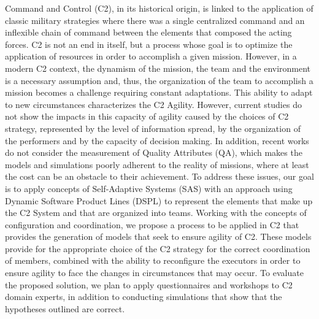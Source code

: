 Command and Control (C2), in its historical origin, is linked to the application of classic military strategies where there was a single centralized command and an inflexible chain of command between the elements that composed the acting forces. C2 is not an end in itself, but a process whose goal is to optimize the application of resources in order to accomplish a given mission. However, in a modern C2 context, the dynamism of the mission, the team and the environment is a necessary assumption and, thus, the organization of the team to accomplish a mission becomes a challenge requiring constant adaptations. This ability to adapt to new circumstances characterizes the C2 Agility. However, current studies do not show the impacts in this capacity of agility caused by the choices of C2 strategy, represented by the level of information spread, by the organization of the performers and by the capacity of decision making. In addition, recent works do not consider the measurement of Quality Attributes (QA), which makes the models and simulations poorly adherent to the reality of missions, where at least the cost can be an obstacle to their achievement. To address these issues, our goal is to apply concepts of Self-Adaptive Systems (SAS) with an approach using Dynamic Software Product Lines (DSPL) to represent the elements that make up the C2 System and that are organized into teams. Working with the concepts of configuration and coordination, we propose a process to be applied in C2 that provides the generation of models that seek to ensure agility of C2. These models provide for the appropriate choice of the C2 strategy for the correct coordination of members, combined with the ability to reconfigure the executors in order to ensure agility to face the changes in circumstances that may occur. To evaluate the proposed solution, we plan to apply questionnaires and workshops to C2 domain experts, in addition to conducting simulations that show that the hypotheses outlined are correct.
